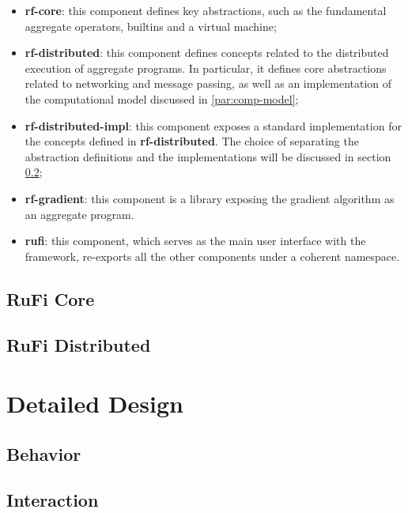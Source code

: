 \begin{itemize}
    \item \textbf{rf-core}: this component defines key abstractions, such as the fundamental aggregate operators, builtins and a virtual machine;
    \item \textbf{rf-distributed}: this component defines concepts related to the distributed execution of aggregate programs.
          In particular, it defines core abstractions related to networking and message passing, as well as an implementation of the computational model discussed in \ref{par:comp-model};
    \item \textbf{rf-distributed-impl}: this component exposes a standard implementation for the concepts defined in \textbf{rf-distributed}.
          The choice of separating the abstraction definitions and the implementations will be discussed in section \ref{subsec:rufi-distributed};
    \item \textbf{rf-gradient}: this component is a library exposing the gradient algorithm as an aggregate program.
    \item \textbf{rufi}: this component, which serves as the main user interface with the framework, re-exports all the other components under a coherent namespace.
\end{itemize}

\subsection{RuFi Core}

\subsection{RuFi Distributed}
\label{subsec:rufi-distributed}

\section{Detailed Design}
\label{sec:detailed-design}

\subsection{Behavior}

\subsection{Interaction}